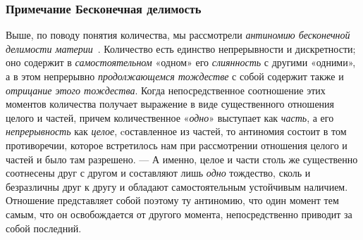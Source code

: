 \subsubsection[Примечание Бесконечная делимость]{Примечание Бесконечная делимость}

Выше, по поводу понятия количества, мы рассмотрели
{\em антиномию бесконечной делимости
материи}~.
Количество есть единство непрерывности и дискретности; оно содержит в
{\em самостоятельном} «одном» его
{\em слиянность} с другими «одними», а в этом
непрерывно {\em продолжающемся тождестве} с собой
содержит также и {\em отрицание этого тождества}. Когда
непосредственное соотношение этих моментов количества получает выражение в
виде существенного отношения целого и частей, причем количественное
«{\em одно}» выступает как
{\em часть}, а его
{\em непрерывность} как
{\em целое}, cоставленное из частей, то антиномия
состоит в том противоречии, которое встретилось нам при рассмотрении
отношения целого и частей и было там разрешено. — А именно, целое и части
столь же существенно соотнесены друг с другом и составляют лишь
{\em одно} тождество, сколь и безразличны друг к другу
и обладают самостоятельным устойчивым наличием. Отношение представляет
собой поэтому ту антиномию, что один момент тем самым, что он освобождается
от другого момента, непосредственно приводит за собой последний.

